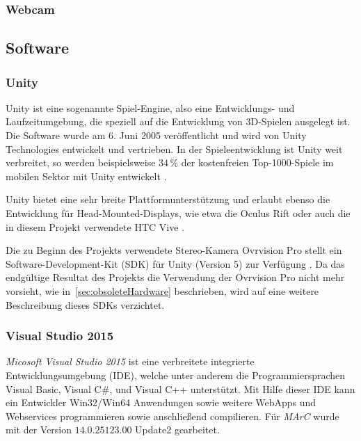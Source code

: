 \subsubsection{Webcam}\label{sec:webcam} 	
\subsection{Software} 
\subsubsection{Unity}\label{sec:unity}
Unity ist eine sogenannte Spiel-Engine, also eine Entwicklungs- und Laufzeitumgebung, die speziell auf die Entwicklung von 3D-Spielen ausgelegt ist. Die Software wurde am 6. Juni 2005 veröffentlicht \cite{haas2014history} und wird von Unity Technologies \cite{website:Unity} entwickelt und vertrieben. In der Spieleentwicklung ist Unity weit verbreitet, so werden beispielsweise $34\,\%$ der kostenfreien Top-1000-Spiele im mobilen Sektor mit Unity entwickelt \cite{website:UnityPR}.

Unity bietet eine sehr breite Plattformunterstützung \cite{website:UnityMultiPlatform} und erlaubt ebenso die Entwicklung für Head-Mounted-Displays, wie etwa die Oculus Rift \cite{website:UnityOculus}\cite{website:UnityVRoverview} oder auch die in diesem Projekt verwendete HTC Vive \cite{website:UnityVRoverview}.

Die zu Beginn des Projekts verwendete Stereo-Kamera Ovrvision Pro stellt ein Software-Development-Kit (SDK) für Unity (Version 5) zur Verfügung \cite{website:ovrvisionSetup}. Da das endgültige Resultat des Projekts die Verwendung der Ovrvision Pro nicht mehr vorsieht, wie in~\ref{sec:obsoleteHardware} beschrieben, wird auf eine weitere Beschreibung dieses SDKs verzichtet.

\subsubsection{Visual Studio 2015}\label{sec:VisualStudio} 

\textit{Micosoft Visual Studio 2015} ist eine verbreitete integrierte Entwicklungsumgebung (IDE), welche unter anderem die Programmiersprachen Visual Basic, Visual C$\#$, und Visual C++ unterstützt. Mit Hilfe dieser IDE kann ein Entwickler Win32/Win64 Anwendungen sowie weitere WebApps und Webservices \cite{website:VisuStud} programmieren sowie anschließend compilieren. Für \textit{MArC} wurde mit der Version $14.0.25123.00$ Update2 gearbeitet.

